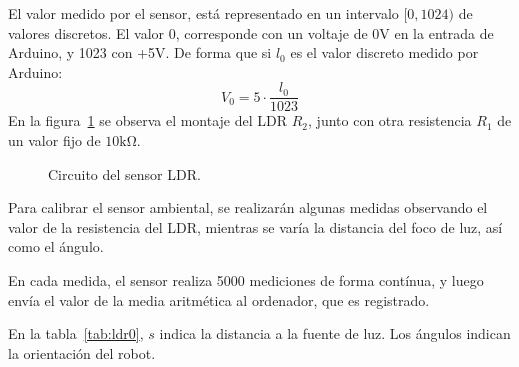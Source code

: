 \documentclass[10pt,a4paper,hidelinks,twocolumn]{article}
\begin{document}
El valor medido por el sensor, está representado en un intervalo $[0, 1024)$ de 
valores discretos. El valor 0, corresponde con un voltaje de 0V en la entrada de 
Arduino, y 1023 con +5V. De forma que si $l_0$ es el valor discreto medido por 
Arduino:
$$ V_0 = 5 \cdot \frac{l_0}{1023} $$
En la figura~\ref{fig:ldr_circuito} se observa el montaje del LDR $R_2$, junto 
con otra resistencia $R_1$ de un valor fijo de $10\si{\kohm}$.

\begin{figure}[h]
\centering
{}
\caption{Circuito del sensor LDR.\label{fig:ldr_circuito}}
\end{figure}

%


Para calibrar el sensor ambiental, se realizarán algunas medidas observando el 
valor de la resistencia del LDR, mientras se varía la distancia del foco de luz, 
así como el ángulo.

En cada medida, el sensor realiza 5000 mediciones de forma contínua, y luego 
envía el valor de la media aritmética al ordenador, que es registrado.

En la tabla~\ref{tab:ldr0}, $s$ indica la distancia a la fuente de luz. Los 
ángulos indican la orientación del robot.
\end{document}
